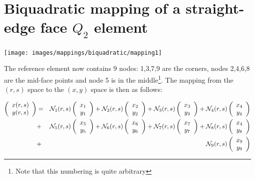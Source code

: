 \section{Biquadratic mapping of a straight-edge face $Q_2$ element }

\begin{center}
\texttt{[image: images/mappings/biquadratic/mapping1]}
\end{center}

The reference element now contains 9 nodes: 1,3,7,9 are the corners, nodes
2,4,6,8 are the mid-face points and node 5 is in the middle\footnote{Note that 
this numbering is quite arbitrary}.
The mapping from the $(r,s)$ space to the $(x,y)$ space is then as follows:

\begin{eqnarray}
\left(
\begin{array}{c}
x(r,s) \\ y(r,s)
\end{array}
\right)
&=&
{\mathcal{N}}_1(r,s)
\left(
\begin{array}{c}
x_1 \\ y_1
\end{array}
\right)
+
{\mathcal{N}}_2(r,s)
\left(
\begin{array}{c}
x_2 \\ y_2
\end{array}
\right)
+
{\mathcal{N}}_3(r,s)
\left(
\begin{array}{c}
x_3 \\ y_3
\end{array}
\right)
+
{\mathcal{N}}_4(r,s)
\left(
\begin{array}{c}
x_4 \\ y_4
\end{array}
\right) \nonumber\\
&+&
{\mathcal{N}}_5(r,s)
\left(
\begin{array}{c}
x_5 \\ y_5
\end{array}
\right)
+
{\mathcal{N}}_6(r,s)
\left(
\begin{array}{c}
x_6 \\ y_6
\end{array}
\right)
+
{\mathcal{N}}_7(r,s)
\left(
\begin{array}{c}
x_7 \\ y_7
\end{array}
\right)
+
{\mathcal{N}}_8(r,s)
\left(
\begin{array}{c}
x_4 \\ y_8
\end{array}
\right) \nonumber\\
&+&
{\mathcal{N}}_9(r,s)
\left(
\begin{array}{c}
x_9 \\ y_9
\end{array}
\right) 
\nonumber
\end{eqnarray}
